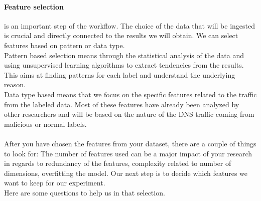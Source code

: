 \paragraph{Feature selection} \label{featureselectionlabel}is an important step of the workflow. The choice of the data that will be ingested is crucial and directly connected to the results we will obtain. We can select features based on pattern or data type.\\
Pattern based selection means through the statistical analysis of the data and using unsupervised learning algorithms to extract tendencies from the results. This aims at finding patterns for each label and understand the underlying reason. \\
Data type based means that we focus on the specific features related to the traffic from the labeled data. Most of these features have already been analyzed by other researchers and will be based on the nature of the DNS traffic coming from malicious or normal labels.\\
\\
After you have chosen the features from your dataset, there are a couple of things to look for: The number of features used can be a major impact of your research in regards to redundancy of the features, complexity related to number of dimensions, overfitting the model. Our next step is to decide which features we want to keep for our experiment. \\
Here are some questions to help us in that selection.

